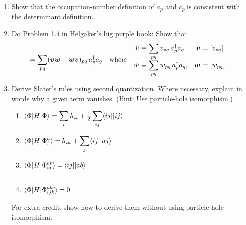 \documentclass[11pt]{article}
\numberwithin{equation}{section}
\begin{document}
\begin{enumerate}
\item
  Show that the occupation-number definition of $a_p$ and $c_p$ is consistent with the determinant definition.

\item
  Do Problem 1.4 in Helgaker's big purple book:
  Show that
\begin{align*}
  [\op{v}, \op{w}]
=
  \sum_{pq}
  (\bm{v}\bm{w} - \bm{w}\bm{v})_{pq}\,
  a_p\dg a_q
&&
\text{where}\hspace{5pt}
\begin{array}{r@{\ }lr@{\ }l}
  \op{v}
&\equiv
\ds{
  \sum_{pq}
  v_{pq}\, a_p\dg a_q
}
,&
  \bm{v}
&=
  [v_{pq}]
\\
  \op{w}
&\equiv
\ds{
  \sum_{pq}
  w_{pq}\, a_p\dg a_q
}
,&
  \bm{w}
&=
  [w_{pq}]\,.
\end{array}
\end{align*}

\item
  Derive Slater's rules using second quantization.
  Where necessary, explain in words why a given term vanishes.
  (Hint: Use particle-hole isomorphism.)
  \begin{enumerate}
  \item
    ${\displaystyle
      \langle\Phi |H|\Phi \rangle
    =
      \sum_i
      h_{ii}
    +
      \tfrac{1}{2}
      \sum_{ij}
      \langle ij||ij\rangle
    }$
  \item
    ${\displaystyle
      \langle\Phi |H|\Phi _i^a\rangle
    =
      h_{ia}
    +
      \sum_j
      \langle ij||aj\rangle
    }$
  \item
    ${\displaystyle
      \langle\Phi |H|\Phi _{ij}^{ab}\rangle
    =
      \langle ij||ab\rangle
      \vphantom{\sum_j}
    }$
  \item
    ${\displaystyle
      \langle\Phi |H|\Phi _{ijk}^{abc}\rangle
    =
      0
    }$
  \end{enumerate}
  For extra credit, show how to derive them without using particle-hole isomorphism.
\end{enumerate}
\end{document}
